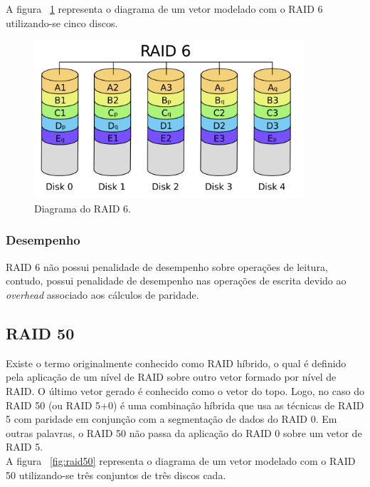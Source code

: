 		
		A figura ~\ref{fig:raid6} representa o diagrama de um vetor modelado com o RAID 6 utilizando-se cinco discos.\\
		
		\begin{figure}[htb]
			\begin{center}
				
				\includegraphics[clip,width=10.0cm]{images/RAID_6.png}
				\caption{Diagrama do RAID 6. }
				\label{fig:raid6}
			\end{center}
		\end{figure} 
		
		\subsubsection{Desempenho}
		RAID 6 não possui penalidade de desempenho sobre operações de leitura, contudo, possui penalidade de desempenho nas operações de escrita devido ao \textit{overhead} associado aos cálculos de paridade.\\
		
		
		\subsection{RAID 50}
		Existe o termo originalmente conhecido como RAID híbrido, o qual é definido pela aplicação de um nível de RAID sobre outro vetor formado por nível de RAID. O último vetor gerado é conhecido como o 
		vetor do topo. Logo, no caso do RAID 50 (ou RAID 5+0) é uma combinação híbrida que usa as técnicas de RAID 5 com paridade em conjunção com a segmentação de dados do RAID 0. Em outras palavras, o RAID 50 não passa da aplicação do RAID 0 sobre um vetor de RAID 5. \\
		
		A figura ~\ref{fig:raid50} representa o diagrama de um vetor modelado com o RAID 50 utilizando-se três conjuntos de três discos cada.\\
		
